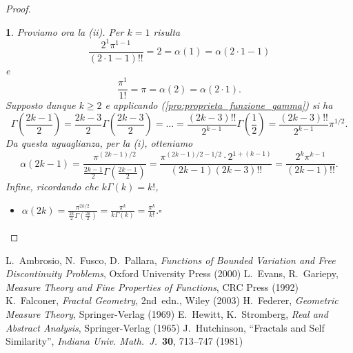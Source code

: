 \documentclass[a4paper,10pt,openright,oneside]{book}
\theoremstyle{theoremstyle}
\theoremstyle{theoremstylewoheader}
\theoremstyle{theoremstyle}
\theoremstyle{proofsecstyle}
\newtheorem{proofsec}{}
\theoremstyle{nonumberplain}
\newtheorem{proof}{Dim.}
\renewcommand{\qedsymbol}{\ensuremath{\square}}
\newcommand{\mymath}[2]{\begin{itemize}%
  \item[]\hfill\hbox{}\ensuremath{\displaystyle #1}\hfill\ensuremath{\displaystyle #2}%
  \end{itemize}}
\begin{document}
\begin{proof}
\begin{proofsec}
Proviamo ora la (ii). Per $k = 1$ risulta 
\[
\frac{2^1\pi^{1-1}}{(2 \cdot 1 - 1)!!} = 2 = \alpha(1) = \alpha(2 \cdot 1 - 1)
\]
e
\[
\frac{\pi^1}{1!} = \pi = \alpha(2) = \alpha(2 \cdot 1).
\]
Supposto dunque $k \ge 2$ e applicando (\ref{pro:proprieta_funzione_gamma}) si ha  
\[
\Gamma\left(\frac{2k-1}{2}\right) = \frac{2k-3}{2}\Gamma\left(\frac{2k-3}{2}\right) = \ldots = \frac{(2k-3)!!}{2^{k-1}}\Gamma\left(\frac{1}{2}\right) = \frac{(2k-3)!!}{2^{k-1}}\pi^{1/2}.
\]
Da questa uguaglianza, per la (i), otteniamo
\[
\alpha(2k-1) = \frac{\pi^{(2k-1)/2}}{\frac{2k-1}{2}\Gamma\left(\frac{2k-1}{2}\right)} = \frac{\pi^{(2k-1)/2 - 1/2} \cdot 2^{1+(k-1)}}{(2k-1)(2k-3)!!} = \frac{2^k \pi^{k-1}}{(2k-1)!!}.
\]
Infine, ricordando che $k\Gamma(k) = k!$,
\mymath{\alpha(2k) = \frac{\pi^{2k/2}}{\frac{2k}{2}\Gamma\left(\frac{2k}{2}\right)} = \frac{\pi^k}{k\Gamma(k)} = \frac{\pi^k}{k!}.}{\qedsymbol}
\end{proofsec}
\end{proof}


\cleardoublepage
{}

\begin{thebibliography}{9999}
 L.~Ambrosio, N.~Fusco, D.~Pallara, \emph{Functions of Bounded Variation and Free Discontinuity Problems}, Oxford University Press (2000)
 L.~Evans, R.~Gariepy, \emph{Measure Theory and Fine Properties of Functions}, CRC Press (1992)
 K.~Falconer, \emph{Fractal Geometry}, 2nd~edn., Wiley (2003)
 H.~Federer, \emph{Geometric Measure Theory}, Springer-Verlag (1969)
 E.~Hewitt, K.~Stromberg, \emph{Real and Abstract Analysis}, Springer-Verlag (1965)
 J.~Hutchinson, ``Fractals and Self Similarity'', \emph{Indiana Univ. Math.~J.}\/~{\bfseries 30}, 713--747 (1981)
\end{thebibliography}


\cleardoublepage
{}
\printindex
\end{document}
